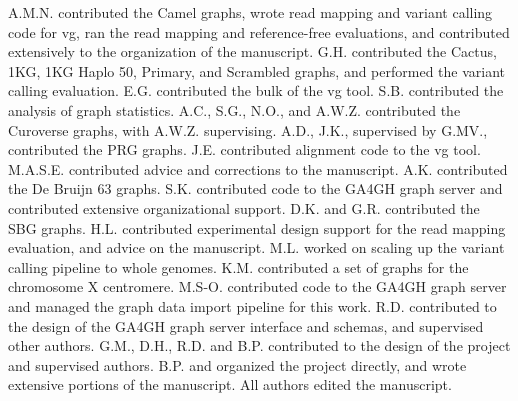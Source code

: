 A.M.N. contributed the Camel graphs, wrote read mapping and variant
calling code for vg, ran the read mapping and reference-free
evaluations, and contributed extensively to the organization of the
manuscript. G.H. contributed the Cactus, 1KG, 1KG Haplo 50, Primary, and
Scrambled graphs, and performed the variant calling evaluation. E.G.
contributed the bulk of the vg tool. S.B. contributed the analysis of
graph statistics. A.C., S.G., N.O., and A.W.Z. contributed the Curoverse
graphs, with A.W.Z. supervising. A.D., J.K., supervised by G.MV.,
contributed the PRG graphs. J.E. contributed alignment code to the vg
tool. M.A.S.E. contributed advice and corrections to the manuscript.
A.K. contributed the De Bruijn 63 graphs. S.K. contributed code to the
GA4GH graph server and contributed extensive organizational support.
D.K. and G.R. contributed the SBG graphs. H.L. contributed experimental
design support for the read mapping evaluation, and advice on the
manuscript. M.L. worked on scaling up the variant calling pipeline to
whole genomes. K.M. contributed a set of graphs for the chromosome X
centromere. M.S-O. contributed code to the GA4GH graph server and
managed the graph data import pipeline for this work. R.D. contributed
to the design of the GA4GH graph server interface and schemas, and
supervised other authors. G.M., D.H., R.D. and B.P. contributed to the
design of the project and supervised authors. B.P. and organized the
project directly, and wrote extensive portions of the manuscript. All
authors edited the manuscript.

